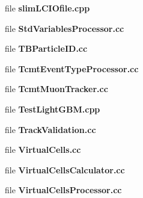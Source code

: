 \begin{DoxyCompactItemize}
file {\bfseries slim\-L\-C\-I\-Ofile.\-cpp}
\item 
file {\bfseries Std\-Variables\-Processor.\-cc}
\item 
file {\bfseries T\-B\-Particle\-I\-D.\-cc}
\item 
file {\bfseries Tcmt\-Event\-Type\-Processor.\-cc}
\item 
file {\bfseries Tcmt\-Muon\-Tracker.\-cc}
\item 
file {\bfseries Test\-Light\-G\-B\-M.\-cpp}
\item 
file {\bfseries Track\-Validation.\-cc}
\item 
file {\bfseries Virtual\-Cells.\-cc}
\item 
file {\bfseries Virtual\-Cells\-Calculator.\-cc}
\item 
file {\bfseries Virtual\-Cells\-Processor.\-cc}
\end{DoxyCompactItemize}
